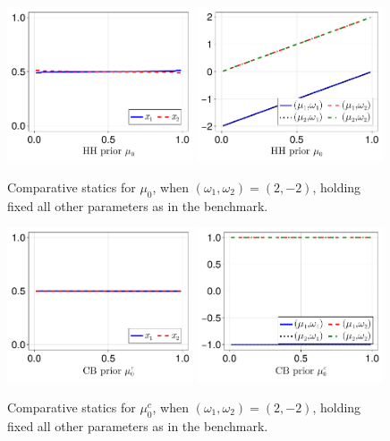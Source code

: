 \documentclass[12pt,a4paper]{article}
\begin{document}
\begin{figure}[H]
\centering
\includegraphics[width=0.49\textwidth]{figures/V8/γ_1/fig_optimal_π_across_μ_0_ω_1_2_ω_2_-2_δ_0.5_.pdf}
\includegraphics[width=0.49\textwidth]{figures/V8/γ_1/fig_posterior_across_μ_0_ω_1_2_ω_2_-2_δ_0.5_.pdf}
\caption{Comparative statics for $\mu_0$, when $(\omega_1,\omega_2)=(2,-2)$, holding fixed all other parameters as in the benchmark.}
\label{FigureA17}
\end{figure}


\begin{figure}[H]
\centering
\includegraphics[width=0.49\textwidth]{figures/V8/γ_1/fig_optimal_π_across_μ_0_c_ω_1_2_ω_2_-2_δ_0.5_.pdf}
\includegraphics[width=0.49\textwidth]{figures/V8/γ_1/fig_posterior_across_μ_0_c_ω_1_2_ω_2_-2_δ_0.5_.pdf}
\caption{Comparative statics for $\mu_0^c$, when $(\omega_1,\omega_2)=(2,-2)$, holding fixed all other parameters as in the benchmark.}
\label{FigureA18}
\end{figure}
\end{document}
